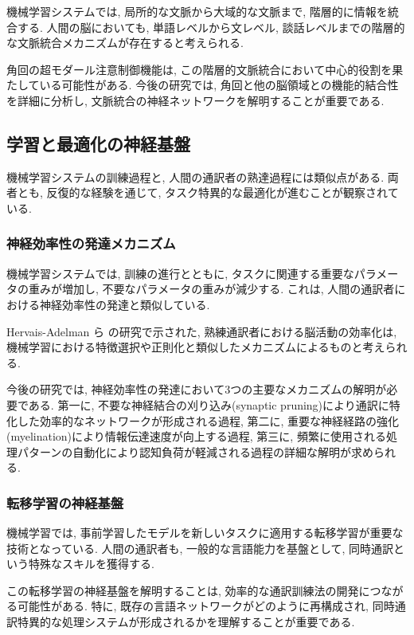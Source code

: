 機械学習システムでは, 局所的な文脈から大域的な文脈まで, 階層的に情報を統合する.
人間の脳においても, 単語レベルから文レベル, 談話レベルまでの階層的な文脈統合メカニズムが存在すると考えられる.

角回の超モダール注意制御機能は, この階層的文脈統合において中心的役割を果たしている可能性がある.
今後の研究では, 角回と他の脳領域との機能的結合性を詳細に分析し, 文脈統合の神経ネットワークを解明することが重要である.

\subsection{学習と最適化の神経基盤}

機械学習システムの訓練過程と, 人間の通訳者の熟達過程には類似点がある.
両者とも, 反復的な経験を通じて, タスク特異的な最適化が進むことが観察されている.

\subsubsection{神経効率性の発達メカニズム}

機械学習システムでは, 訓練の進行とともに, タスクに関連する重要なパラメータの重みが増加し, 不要なパラメータの重みが減少する.
これは, 人間の通訳者における神経効率性の発達と類似している.

Hervais-Adelman ら \cite{hervais2015plasticity} の研究で示された, 熟練通訳者における脳活動の効率化は, 機械学習における特徴選択や正則化と類似したメカニズムによるものと考えられる.

今後の研究では, 神経効率性の発達において3つの主要なメカニズムの解明が必要である.
第一に, 不要な神経結合の刈り込み(synaptic pruning)により通訳に特化した効率的なネットワークが形成される過程, 第二に, 重要な神経経路の強化(myelination)により情報伝達速度が向上する過程, 第三に, 頻繁に使用される処理パターンの自動化により認知負荷が軽減される過程の詳細な解明が求められる.

\subsubsection{転移学習の神経基盤}

機械学習では, 事前学習したモデルを新しいタスクに適用する転移学習が重要な技術となっている.
人間の通訳者も, 一般的な言語能力を基盤として, 同時通訳という特殊なスキルを獲得する.

この転移学習の神経基盤を解明することは, 効率的な通訳訓練法の開発につながる可能性がある.
特に, 既存の言語ネットワークがどのように再構成され, 同時通訳特異的な処理システムが形成されるかを理解することが重要である.

